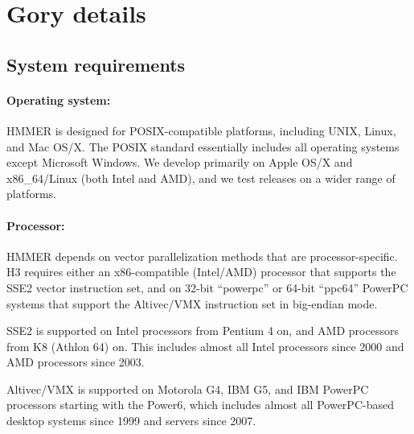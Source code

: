 \section{Gory details}

\subsection{System requirements}

\paragraph{Operating system:} HMMER is designed for
POSIX-compatible platforms, including UNIX, Linux, and Mac OS/X. The
POSIX standard essentially includes all operating systems except
Microsoft Windows.  We develop primarily on Apple OS/X and
x86\_64/Linux (both Intel and AMD), and we test releases on a wider
range of platforms.
  

\paragraph{Processor:} HMMER depends on vector parallelization methods
that are processor-specific. H3 requires either an x86-compatible
(Intel/AMD) processor that supports the SSE2 vector instruction set,
and on 32-bit ``powerpc'' or 64-bit ``ppc64'' PowerPC systems that
support the Altivec/VMX instruction set in big-endian mode.

SSE2 is supported on Intel processors from Pentium 4 on, and AMD
processors from K8 (Athlon 64) on. This includes almost all Intel
processors since 2000 and AMD processors since 2003.

Altivec/VMX is supported on Motorola G4, IBM G5, and IBM PowerPC
processors starting with the Power6, which includes almost all
PowerPC-based desktop systems since 1999 and servers since
2007.

